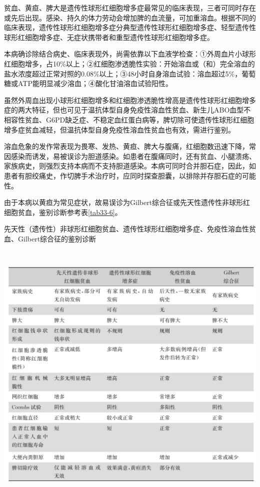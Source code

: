 贫血、黄疸、脾大是遗传性球形红细胞增多症最常见的临床表现，三者可同时存在或先后出现。感染、持久的体力劳动会增加脾的血流量，可加重溶血。根据不同的临床表现，遗传性球形红细胞增多症分典型遗传性球形红细胞增多症、轻型遗传性球形红细胞增多症、无症状携带者和重型遗传性球形红细胞增多症。

本病确诊除结合病史、临床表现外，尚需依靠以下血液学检查：①外周血片小球形红细胞增多，占10\%以上；②红细胞渗透脆性实验：开始溶血或（和）完全溶血的盐水浓度超过正常对照的0.08\%以上；③48小时自身溶血试验：溶血超过5\%，葡萄糖或ATP能明显减少溶血；④酸化甘油溶血试验阳性。

虽然外周血出现小球形红细胞增多和红细胞渗透脆性增高是遗传性球形红细胞增多症的两大特征，但也可见于温抗体型自身免疫性溶血性贫血、新生儿ABO血型不相容性贫血、G6PD缺乏症、不稳定血红蛋白病等，脾切除可使遗传性球形红细胞增多症贫血减轻，但温抗体型自身免疫性溶血性贫血也有效，需进行鉴别。

溶血危象的发作常表现为畏寒、发热、黄疸、脾大与腹痛，红细胞数迅速下降，常因感染而诱发，易被误诊为胆道感染。如患者在腹痛同时，还有贫血、小腿溃疡、家族病史，则强烈支持本病而不支持胆道感染。本病可同时合并胆石症，因此，如患者有胆绞痛史，作切脾手术治疗时，应同时探查胆囊，以排除并存胆石症的可能性。

由于本病以黄疸为常见症状，故易误诊为Gilbert综合征或先天性遗传性非球形红细胞贫血，鉴别诊断参考表\ref{tab33-6}。

\begin{table}[htbp]
\centering
\caption{先天性（遗传性）非球形红细胞贫血、遗传性球形红细胞增多症、免疫性溶血性贫血、Gilbert综合征的鉴别诊断}
\label{tab33-6}
\includegraphics[width=5.98958in,height=5.15625in]{./images/Image00171.jpg}
\end{table}

